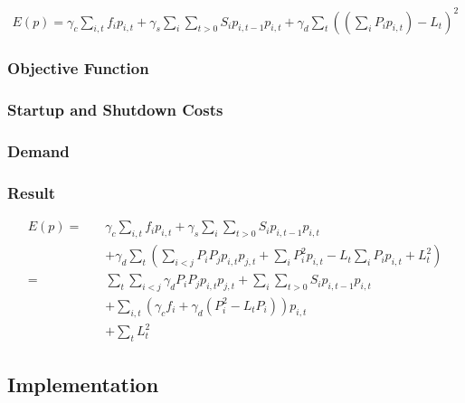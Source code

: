 \begin{align} \label{formula:dqm.start}
  E(p) = \gamma_c \sum_{i, t} f_i p_{i, t}
  + \gamma_s \sum_i \sum_{t > 0} S_i p_{i, t-1} p_{i, t}
  + \gamma_d \sum_t \left( \left( \sum_i P_i p_{i, t} \right) - L_t \right) ^2
\end{align}

\subsubsection{Objective Function}


\subsubsection{Startup and Shutdown Costs}


\subsubsection{Demand}


\subsubsection{Result}

\begin{subequations}
\begin{align}
  E(p) = \quad
  &
  \gamma_c \sum_{i, t} f_i p_{i, t}
  + \gamma_s \sum_i \sum_{t > 0} S_i p_{i, t-1} p_{i, t}
  \\ &
  + \gamma_d \sum_t \left(
    \sum_{i < j} P_i P_j p_{i, t} p_{j, t}
    + \sum_i P_i^2 p_{i, t} - L_t \sum_i P_i p_{i, t}
    + L_t^2
  \right) \\
  = \quad
  &
  \sum_t \sum_{i < j} \gamma_d P_i P_j p_{i, t} p_{j, t}
  + \sum_i \sum_{t > 0} S_i p_{i, t-1} p_{i, t}
  \\ &
  + \sum_{i, t} \left(
    \gamma_c f_i + \gamma_d \left(P_i^2 - L_t P_i \right)
  \right) p_{i, t}
  \\ &
  + \sum_t L_t^2
\end{align}
\end{subequations}


\subsection{Implementation}

